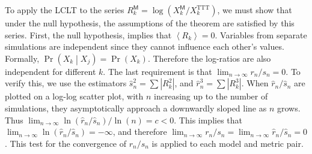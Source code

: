\documentclass[conference]{IEEEtran}
\newcommand{\M}{\mathsf{M}}
\newcommand{\E}[1]{\left<#1\right>}
\newcommand{\abs}[1]{\left|#1\right|}
\newcommand{\TTT}{\text{TTT}}
\begin{document}
\vspace{1em}
To apply the LCLT to the series $R_k^\M=\log(X_k^\M/X_k^\TTT)$, we must show that under the null hypothesis, the assumptions of the theorem are satisfied by this series. First, the null hypothesis, implies that $\E{R_k}=0$. Variables from separate simulations are independent since they cannot influence each other's values. Formally, $\Pr\left(X_k\middle|X_j\right)=\Pr\left(X_k\right)$. Therefore the log-ratios are also independent for different $k$. The last requirement is that $\lim_{n\to\infty}{r_n/s_n}=0$. To verify this, we use the estimators $\hat{s}_n^2=\sum{\abs{R_k^2}}$, and $\hat{r}_n^3=\sum{\abs{R_k^3}}$. When $\hat{r}_n/\hat{s}_n$ are plotted on a log-log scatter plot, with $n$ increasing up to the number of simulations, they asymptotically approach a downwardly sloped line as $n$ grows. Thus $\lim_{n\to\infty}{\ln(\hat{r}_n/\hat{s}_n)/\ln(n)}=c<0$. This implies that $\lim_{n\to\infty}{\ln(\hat{r}_n/\hat{s}_n)}=-\infty$, and therefore $\lim_{n\to\infty}{r_n/s_n}=\lim_{n\to\infty}{\hat{r}_n/\hat{s}_n}=0$. This test for the convergence of $r_n/s_n$ is applied to each model and metric pair. %



\end{document}
